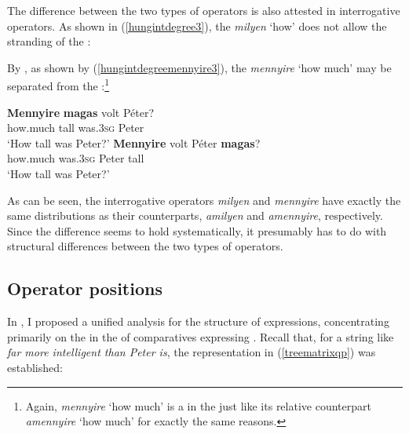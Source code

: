 The difference between the two types of operators is also attested in interrogative operators. As shown in (\ref{hungintdegree3}), the  \textit{milyen} `how' does not allow the stranding of the :

\ea \label{hungintdegree3}
\z
\z

By , as shown by (\ref{hungintdegreemennyire3}), the  \textit{mennyire} `how much' may be separated from the :\footnote{Again, \textit{mennyire} `how much' is a  in the  just like its relative counterpart \textit{amennyire} `how much' for exactly the same reasons.} 

\ea \label{hungintdegreemennyire3}
\ea \gll \textbf{Mennyire} \textbf{magas} volt	Péter?\\
how.much	tall was.\textsc{3sg}	Peter\\
\glt `How tall was Peter?'
\ex	\gll \textbf{Mennyire} volt Péter \textbf{magas}?\\
how.much	was.\textsc{3sg} Peter tall\\
\glt `How tall was Peter?'
\z
\z

As can be seen, the interrogative operators \textit{milyen} and \textit{mennyire} have exactly the same distributions as their  counterparts, \textit{amilyen} and \textit{amennyire}, respectively. Since the difference seems to hold systematically, it presumably has to do with structural differences between the two types of operators.

\subsection{Operator positions} \label{sec:3operatorpositions}
In , I proposed a unified analysis for the structure of  expressions, concentrating primarily on the  in the  of comparatives expressing . Recall that, for a string like \textit{far more intelligent than Peter is}, the representation in (\ref{treematrixqp}) was established:

